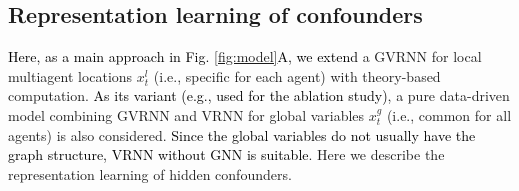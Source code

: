 \documentclass[journal]{IEEEtran}
\begin{document}
\subsection{Representation learning of confounders}
\label{ssec:representation}
\textcolor{black}{Here, as a main approach in Fig. \ref{fig:model}A, we extend} a GVRNN \cite{Yeh19} for local multiagent locations $x^l_t$  (i.e., specific for each agent) with theory-based computation.
\textcolor{black}{As its variant (e.g., used for the ablation study)}, a pure data-driven model combining GVRNN and VRNN \cite{Chung15} for global variables $x^g_t$ (i.e., common for all agents) is also considered. 
\textcolor{black}{Since the global variables do not usually have the graph structure, VRNN without GNN is suitable}. 
Here we describe the representation learning of hidden confounders.
\end{document}
